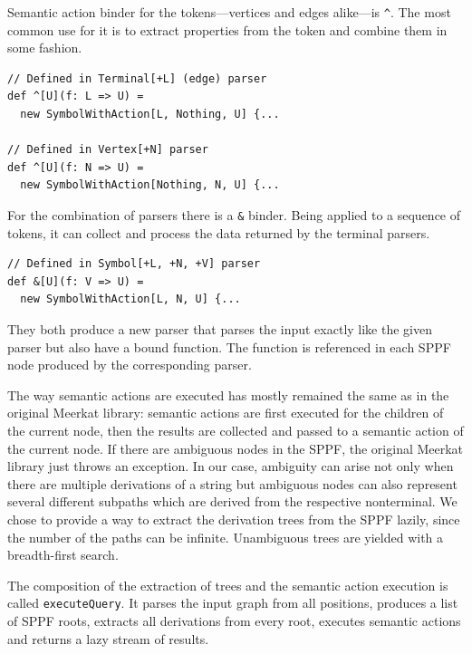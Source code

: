 Semantic action binder for the tokens---vertices and edges alike---is \lstinline{^}. The most common use for it is to extract properties from the token and combine them in some fashion.

\begin{lstlisting}
// Defined in Terminal[+L] (edge) parser
def ^[U](f: L => U) =
  new SymbolWithAction[L, Nothing, U] {...

// Defined in Vertex[+N] parser
def ^[U](f: N => U) =
  new SymbolWithAction[Nothing, N, U] {...
\end{lstlisting}

For the combination of parsers there is a \lstinline{&} binder. Being  applied to a sequence of tokens, it can collect and process the data returned by the terminal parsers.
\begin{lstlisting}
// Defined in Symbol[+L, +N, +V] parser
def &[U](f: V => U) =
  new SymbolWithAction[L, N, U] {...
\end{lstlisting}

They both produce a new parser that parses the input exactly like the given parser but also have a bound function.
The function is referenced in each SPPF node produced by the corresponding parser.

The way semantic actions are executed has mostly remained the same as in the original Meerkat library: semantic actions are first executed for the children of the current node, then the results are collected and passed to a semantic action of the current node.
If there are ambiguous nodes in the SPPF, the original Meerkat library just throws an exception.
In our case, ambiguity can arise not only when there are multiple derivations of a string but ambiguous nodes can also represent several different subpaths which are derived from the respective nonterminal.
We chose to provide a way to extract the derivation trees from the SPPF lazily, since the number of the paths can be infinite.
Unambiguous trees are yielded with a breadth-first search.

The composition of the extraction of trees and the semantic action execution is called \lstinline{executeQuery}.
It parses the input graph from all positions, produces a list of SPPF roots, extracts all derivations from every root, executes semantic actions and returns a lazy stream of results.